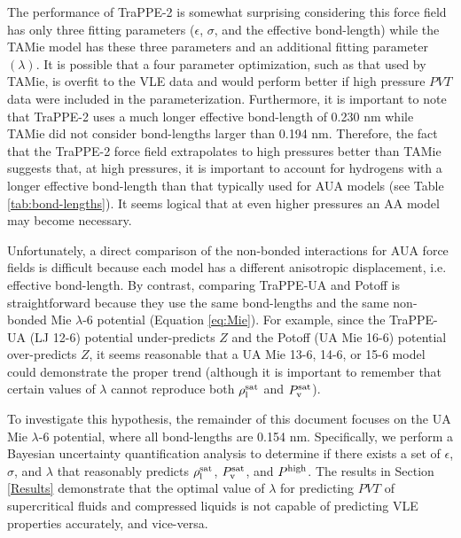\documentclass[preprint,letterpaper,floatfix,citeautoscript,aip,jcp]{revtex4-1}
\begin{document}
The performance of TraPPE-2 is somewhat surprising considering this force field has only three fitting parameters ($\epsilon$, $\sigma$, and the effective bond-length) while the TAMie model has these three parameters and an additional fitting parameter $(\lambda)$. It is possible that a four parameter optimization, such as that used by TAMie, is overfit to the VLE data and would perform better if high pressure $PVT$ data were included in the parameterization. Furthermore, it is important to note that TraPPE-2 uses a much longer effective bond-length of 0.230 nm while TAMie did not consider bond-lengths larger than 0.194 nm. Therefore, the fact that the TraPPE-2 force field extrapolates to high pressures better than TAMie suggests that, at high pressures, it is important to account for hydrogens with a longer effective bond-length than that typically used for AUA models (see Table \ref{tab:bond-lengths}). It seems logical that at even higher pressures an AA model may become necessary.


Unfortunately, a direct comparison of the non-bonded interactions for AUA force fields is difficult because each model has a different anisotropic displacement, i.e. effective bond-length. 
By contrast, 
comparing TraPPE-UA and Potoff is straightforward because they use the same bond-lengths and the same non-bonded Mie $\lambda$-6 potential (Equation \ref{eq:Mie}). For example, since the TraPPE-UA (LJ 12-6) potential under-predicts $Z$ and the Potoff (UA Mie 16-6) potential over-predicts $Z$, it seems reasonable that a UA Mie 13-6, 14-6, or 15-6 model 
could
demonstrate the proper trend (although it is important to remember that certain values of $\lambda$ cannot reproduce both $\rho_{\rm l}^{\rm sat}$ and $P_{\rm v}^{\rm sat}$).

To investigate this hypothesis, the remainder of this document focuses on the UA Mie $\lambda$-6 potential, where all bond-lengths are 0.154 nm. 
Specifically, we perform a Bayesian uncertainty quantification analysis to determine if there exists a set of $\epsilon$, $\sigma$, and $\lambda$ that reasonably predicts $\rho_{\rm l}^{\rm sat}$, $P_{\rm v}^{\rm sat}$, and $P^{\rm high}$. The results in Section \ref{Results} demonstrate that the optimal value of $\lambda$ for predicting $PVT$ of supercritical fluids and compressed liquids is not capable of predicting VLE properties accurately, and vice-versa. 
\end{document}
